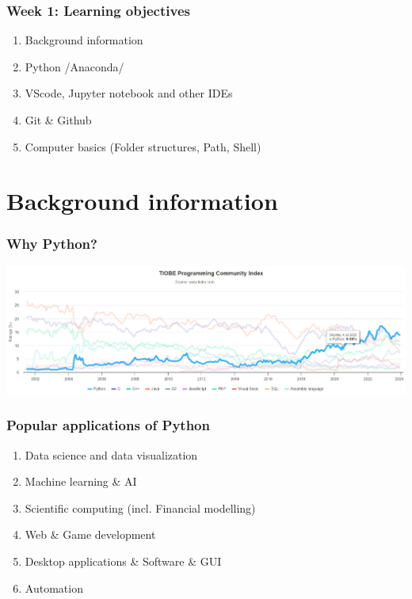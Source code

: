 \documentclass{beamer}
\begin{document}
\begin{frame}
    \frametitle{Week 1: Learning objectives}
    \begin{enumerate}
        \item Background information
        \item Python /Anaconda/
        \item VScode, Jupyter notebook and other IDEs
        \item Git \& Github
        \item Computer basics (Folder structures, Path, Shell)
    \end{enumerate}
\end{frame}


\section{Background information} 



\begin{frame}
    \frametitle{Why Python?}
    \centering
    \includegraphics[scale = 0.3]{figures/trend_python.jpg}
\end{frame}

\begin{frame}
    \frametitle{Popular applications of Python}
    \begin{enumerate}
        \item Data science and data visualization
        \item Machine learning \& AI
        \item Scientific computing (incl. Financial modelling)
        \item Web \& Game development
        \item Desktop applications \& Software \& GUI
        \item Automation
    \end{enumerate}
\end{frame}
\end{document}
